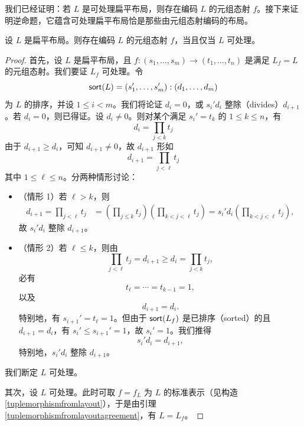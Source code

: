 我们已经证明：若 $L$ 是可处理扁平布局，则存在编码 $L$ 的元组态射 $f$。接下来证明逆命题，它蕴含可处理扁平布局恰是那些由元组态射编码的布局。

\begin{proposition}\label{tractableflatlayoutscomefromtuplemorphisms}
设 $L$ 是扁平布局。则存在编码 $L$ 的元组态射 $f$，当且仅当 $L$ 可处理。
\end{proposition}

\begin{proof}
    首先，设 $L$ 是扁平布局，且 $f:(s_1,\dots,s_m) \to (t_1,\dots,t_n)$ 是满足 $L_f = L$ 的元组态射。我们要证 $L_f$ 可处理。令
    \[
    \mathsf{sort}(L) = (s_1',\dots,s_m'):(d_1,\dots,d_m)
    \]
    为 $L$ 的排序，并设 $ 1 \leq i < m$。我们将论证 $d_i = 0$，或 $s_i'd_i$ 整除（divides）$d_{i+1}$。若 $d_i = 0$，则已得证。设 $d_i \neq 0$。则对某个满足 $s_i' = t_k$ 的 $1 \leq k \leq n$，有
    \[d_i = \prod_{j< k}t_j\]
    由于 $d_{i+1} \geq d_i$，可知 $d_{i+1} \neq 0$，故 $d_{i+1}$ 形如
    \[d_{i+1} = \prod_{j<\ell} t_j\]
    其中 $1 \leq \ell \leq n$。分两种情形讨论：
    \begin{itemize}
        \item （情形 1）若 $\ell > k$，则
        \begin{align*}
            d_{i+1} = \prod_{j < \ell} t_j & = \left(\prod_{j \leq k} t_j \right) \left(\prod_{k < j < \ell} t_j \right) = s_i'd_i\left( \prod_{k<j<\ell} t_j \right),
        \end{align*}
        故 $s_i'd_i$ 整除 $d_{i+1}$。
        \item （情形 2）若 $\ell \leq k$，则由
        \[\prod_{j < \ell} t_j = d_{i+1}  \geq d_i =   \prod_{j < k} t_j,\]
        必有
        \[t_\ell  = \cdots = t_{k-1} = 1,\]
        以及
        \[
        d_{i+1} = d_i.
        \]
        特别地，有 $s_{i+1}' = t_\ell = 1$。但由于 $\mathsf{sort}(L_f)$ 是已排序（sorted）的且 $d_{i+1} = d_i$，有 $s_i' \leq s_{i+1}' = 1$，故 $s_i' = 1$。我们推得
        \[s_i' d_i  = d_{i+1},\]
        特别地，$s_i'd_i$ 整除 $d_{i+1}$。
    \end{itemize}
    我们断定 $L$ 可处理。

    其次，设 $L$ 可处理。此时可取 $f = f_L$ 为 $L$ 的标准表示（见构造 \ref{tuplemorphismfromlayout}），于是由引理 \ref{tuplemorphismfromlayoutagreement}，有 $L = L_f$。
\end{proof}




